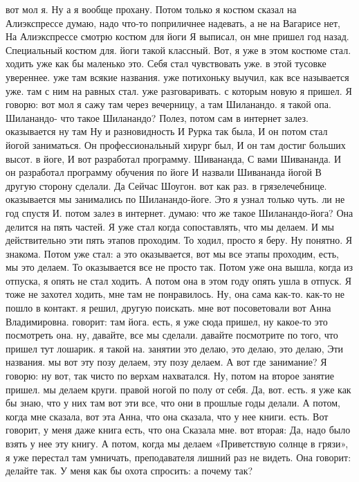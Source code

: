 вот мол я.
Ну а я вообще прохану. Потом только я костюм сказал на Алиэкспрессе думаю, надо что-то поприличнее надевать, а не на Вагарисе нет, На Алиэкспрессе смотрю костюм для йоги Я выписал, он мне пришел год назад.
Специальный костюм для.
йоги такой классный. Вот, я уже в этом костюме стал.
ходить уже как бы маленько это.
Себя стал чувствовать уже.
в этой тусовке увереннее. уже там всякие названия.
уже потихоньку выучил, как все называется уже.
там с ним на равных стал.
уже разговаривать. с которым новую я пришел. Я говорю: вот мол я сажу там через вечерницу, а там Шиланандо.
я такой опа.
Шиланандо- что такое Шиланандо? Полез, потом сам в интернет залез.
оказывается ну там Ну и разновидность И Рурка так была, И он потом стал йогой заниматься. Он профессиональный хирург был, И он там достиг больших высот.
в йоге, И вот разработал программу.
Шивананда, С вами Шивананда.
И он разработал программу обучения по йоге И назвали
Шивананда йогой В другую сторону сделали.
Да Сейчас Шоугон.
вот как раз.
в грязелечебнице. оказывается мы занимались по Шиланандо-йоге. Это я узнал только чуть.
ли не год спустя И.
потом залез в интернет. думаю: что же такое Шиланандо-йога?
Она делится на пять частей.
Я уже стал когда сопоставлять, что мы делаем.
И мы действительно эти пять этапов проходим.
То ходил, просто я беру.
Ну понятно.
Я знакома.
Потом уже стал: а это оказывается, вот мы все этапы проходим, есть, мы это делаем.
То оказывается все не просто так.
Потом уже она вышла, когда из отпуска, я опять не стал ходить.
А потом она в этом году опять ушла в отпуск.
Я тоже не захотел ходить, мне там не понравилось.
Ну, она сама как-то.
как-то не пошло в контакт.
я решил, другую поискать. мне вот посоветовали вот Анна Владимировна.
говорит: там йога.
есть, я уже сюда пришел, ну какое-то это посмотреть она. ну, давайте, все мы сделали. давайте посмотрите по того, что пришел тут лошарик.
я такой на.
занятии это делаю, это делаю, это делаю, Эти названия. мы вот эту позу делаем, эту позу делаем. А вот где занимание? Я говорю: ну вот, так чисто по верхам нахватался. Ну, потом на второе занятие пришел.
мы делаем круги.
правой ногой по полу от себя. Да, вот.
есть. я уже как бы знаю, что у них там вот эти все, что они в прошлые годы делали. А потом, когда мне сказала, вот эта Анна, что она сказала,
что у нее книги.
есть.
Вот говорит, у меня даже книга есть, что она Сказала мне. вот вторая:
Да, надо было взять у нее эту книгу.
А потом, когда мы делаем «Приветствую солнце в грязи», я уже перестал там умничать, преподавателя лишний раз не видеть.
Она говорит: делайте так.
У меня как бы охота спросить: а почему так?
